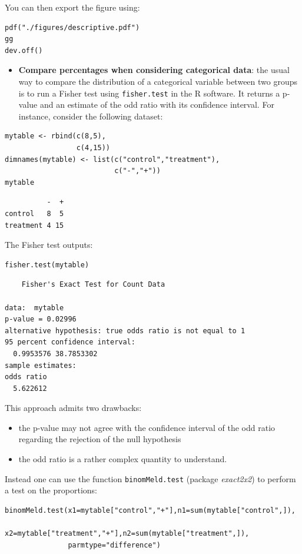 \documentclass{article}
\begin{document}
You can then export the figure using:
\lstset{language=r,label= ,caption= ,captionpos=b,numbers=none}
\begin{lstlisting}
pdf("./figures/descriptive.pdf")
gg
dev.off()
\end{lstlisting}

\begin{itemize}
\item \textbf{Compare percentages when considering categorical data}: the usual
way to compare the distribution of a categorical variable between
two groups is to run a Fisher test using \texttt{fisher.test} in the R
software. It returns a p-value and an estimate of the odd ratio with
its confidence interval. For instance, consider the following
dataset:
\end{itemize}
\lstset{language=r,label= ,caption= ,captionpos=b,numbers=none}
\begin{lstlisting}
mytable <- rbind(c(8,5),
				 c(4,15))
dimnames(mytable) <- list(c("control","treatment"),
						  c("-","+"))
mytable
\end{lstlisting}

\begin{verbatim}
          -  +
control   8  5
treatment 4 15
\end{verbatim}
The Fisher test outputs:
\lstset{language=r,label= ,caption= ,captionpos=b,numbers=none}
\begin{lstlisting}
fisher.test(mytable)
\end{lstlisting}

\begin{verbatim}
	Fisher's Exact Test for Count Data

data:  mytable
p-value = 0.02996
alternative hypothesis: true odds ratio is not equal to 1
95 percent confidence interval:
  0.9953576 38.7853302
sample estimates:
odds ratio 
  5.622612
\end{verbatim}

This approach admits two drawbacks:
\begin{itemize}
\item the p-value may not agree with the confidence interval of the odd
ratio regarding the rejection of the null hypothesis
\item the odd ratio is a rather complex quantity to understand.
\end{itemize}
Instead one can use the function \texttt{binomMeld.test} (package \emph{exact2x2})
to perform a test on the proportions:
\lstset{language=r,label= ,caption= ,captionpos=b,numbers=none}
\begin{lstlisting}
binomMeld.test(x1=mytable["control","+"],n1=sum(mytable["control",]),
			   x2=mytable["treatment","+"],n2=sum(mytable["treatment",]),
			   parmtype="difference")
\end{lstlisting}
\end{document}
